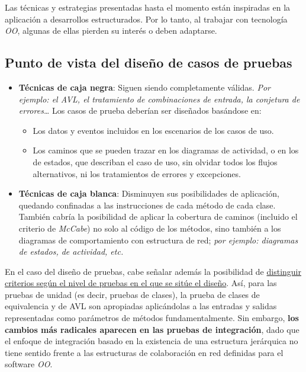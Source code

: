 Las técnicas y estrategias presentadas hasta el momento están inspiradas en la aplicación a desarrollos estructurados. Por lo tanto, al trabajar con tecnología \textit{OO}, algunas de ellas pierden su interés o deben adaptarse.\\

\subsection{Punto de vista del diseño de casos de pruebas}

\begin{itemize}
    \item \textbf{Técnicas de caja negra}: Siguen siendo completamente válidas. \textit{Por ejemplo: el AVL, el tratamiento de combinaciones de entrada, la conjetura de errores\ldots} Los casos de prueba deberían ser diseñados basándose en:
          \begin{itemize}
              \item Los datos y eventos incluidos en los escenarios de los casos de uso.
              \item Los caminos que se pueden trazar en los diagramas de actividad, o en los de estados, que describan el caso de uso, sin olvidar todos los flujos alternativos, ni los tratamientos de errores y excepciones.
          \end{itemize}
    \item \textbf{Técnicas de caja blanca}: Disminuyen sus posibilidades de aplicación, quedando confinadas a las instrucciones de cada método de cada clase. También cabría la posibilidad de aplicar la cobertura de caminos (incluido el criterio de \textit{McCabe}) no solo al código de los métodos, sino también a los diagramas de comportamiento con estructura de red; \textit{por ejemplo: diagramas de estados, de actividad, etc.}
\end{itemize}

En el caso del diseño de pruebas, cabe señalar además la posibilidad de \uline{distinguir criterios según el nivel de pruebas en el que se sitúe el diseño}. Así, para las pruebas de unidad (es decir, pruebas de clases), la prueba de clases de equivalencia y de AVL  son apropiadas aplicándolas a las entradas y salidas representadas como parámetros de métodos fundamentalmente. Sin embargo, \textbf{los cambios más radicales aparecen en las pruebas de integración}, dado que el enfoque de integración basado en la existencia de una estructura jerárquica no tiene sentido frente a las estructuras de colaboración en red definidas para el software \textit{OO}.\\

